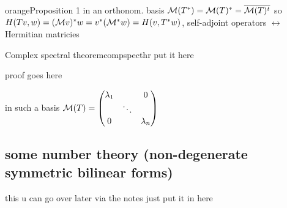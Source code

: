 \documentclass{report}
\begin{document}
\begin{mybox}{orange}{Proposition 1}
    in an orthonom. basis \( \mathcal{M} (T^*) = \mathcal{M} (T)^*=\overline{\mathcal{M}(T)^t}  \) so \( H(Tv,w)=(\mathcal{M} v )^*w = v^* (\mathcal{M}^* w)=H(v,T^*w) \), self-adjoint operators \( \leftrightarrow \) Hermitian matricies 

\end{mybox}


\begin{definition}{Complex spectral theorem}{compspecthr}
  put it here 
\end{definition}

proof goes here

in such a basis \( \mathcal{M} (T) = \begin{pmatrix} \lambda_1 & \, & 0 \\ \, & \ddots& \, \\ 0 & \, & \lambda_n \end{pmatrix}  \)


\subsection{some number theory (non-degenerate symmetric bilinear forms)}

this u can go over later via the notes just put it in here
\end{document}
